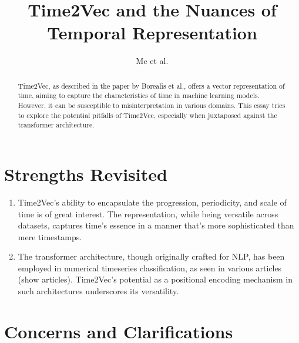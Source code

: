 \documentclass{tufte-handout}
\title{Time2Vec and the Nuances of Temporal Representation}
\author{
 Me et al.
}
\begin{document}
\maketitle%
\vspace{12pt}

\begin{abstract}
Time2Vec, as described in the paper by Borealis et al.\cite{time2vec}, offers a vector representation of time, aiming to capture the characteristics of time in machine learning models. However, it can be susceptible to misinterpretation in various domains. This essay tries to explore the potential pitfalls of Time2Vec, especially when juxtaposed against the transformer architecture.
\end{abstract}

\section{Strengths Revisited}

\begin{enumerate}
\item Time2Vec's ability to encapsulate the progression, periodicity, and scale of time is of great interest. The representation, while being versatile across datasets, captures time's essence in a manner that's more sophisticated than mere timestamps.

\item The transformer architecture, though originally crafted for NLP, has been employed in numerical timeseries classification, as seen in various articles (show articles). Time2Vec's potential as a positional encoding mechanism in such architectures underscores its versatility.
\end{enumerate}

\section{Concerns and Clarifications}
\end{document}
